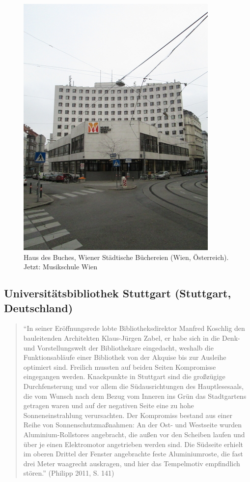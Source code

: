 \documentclass[a4paper,
fontsize=11pt,
oneside,
numbers=noperiodatend,
parskip=half-,
bibliography=totoc,
final
]{scrartcl}
\begin{document}
\begin{figure}[htbp]
\centering
\includegraphics{./img/032.jpg}
\caption{Haus des Buches, Wiener Städtische Büchereien (Wien,
Österreich). Jetzt: Musikschule
Wien}
\end{figure}

\subsection*{Universitätsbibliothek Stuttgart (Stuttgart,
Deutschland)}\label{universituxe4tsbibliothek-stuttgart-stuttgart-deutschland}

\begin{quote}
\enquote{In seiner Eröffnungsrede lobte Bibliotheksdirektor Manfred
Koschlig den bauleitenden Architekten Klaus-Jürgen Zabel, er habe sich
in die Denk- und Vorstellungswelt der Bibliothekare eingedacht, weshalb
die Funktionsabläufe einer Bibliothek von der Akquise bis zur Ausleihe
optimiert sind. Freilich mussten auf beiden Seiten Kompromisse
eingegangen werden. Knackpunkte in Stuttgart sind die großzügige
Durchfensterung und vor allem die Südausrichtungen des Hauptlesesaals,
die vom Wunsch nach dem Bezug vom Inneren ins Grün das Stadtgartens
getragen waren und auf der negativen Seite eine zu hohe
Sonneneinstrahlung verursachten. Der Kompromiss bestand aus einer Reihe
von Sonnenschutzmaßnahmen: An der Ost- und Westseite wurden
Aluminium-Rollstores angebracht, die außen vor den Scheiben laufen und
über je einen Elektromotor angetrieben werden sind. Die Südseite erhielt
im oberen Drittel der Fenster angebrachte feste Aluminiumroste, die fast
drei Meter waagrecht auskragen, und hier das Tempelmotiv empfindlich
stören.} (Philipp 2011, S. 141)
\end{quote}
\end{document}
